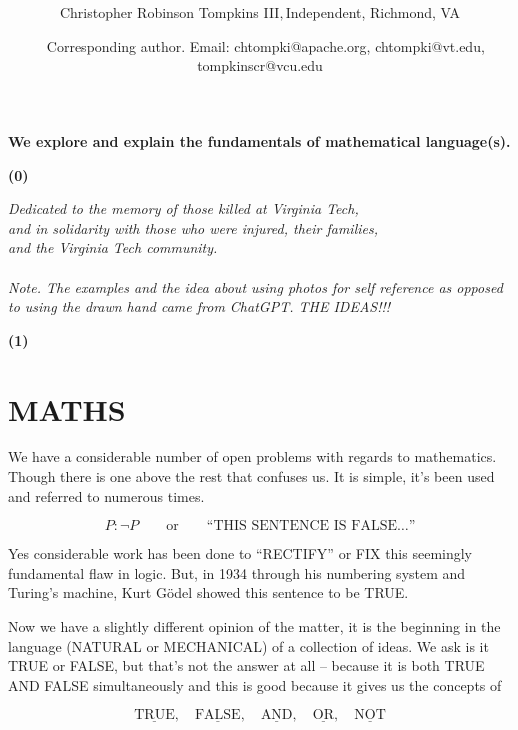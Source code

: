 \documentclass[12pt]{article}
\date{}
\title{\bfseries \boldmath \scititle}
\author{
	Christopher Robinson Tompkins III$,
	$Independent, Richmond, VA\and\
	Corresponding author. Email: chtompki@apache.org, chtompki@vt.edu, tompkinscr@vcu.edu
}
\renewenvironment{abstract}
	{\quotation}
	{\endquotation}
\begin{document}
 

\maketitle

\begin{abstract} \bfseries \boldmath
We explore and explain the fundamentals of mathematical language(s).
\end{abstract}


\textbf{(0)}
\begin{center}
    \emph{Dedicated to the memory of those killed at Virginia Tech,\\
    and in solidarity with those who were injured, their families,\\
    and the Virginia Tech community.}
    \qquad\\
    \qquad\\
    \emph{Note. The examples and the idea about using photos for self reference as opposed to using the drawn
    hand came from ChatGPT. THE IDEAS!!!}
\end{center}

\textbf{(1)}
\section*{MATHS}

We have a considerable number of open problems with regards to mathematics.
Though there is one above the rest that confuses us. It is simple, it's been
used and referred to numerous times.

\[
    P:\neg P
    \qquad\text{or}\qquad
    \text{``THIS SENTENCE IS FALSE\ldots''}
\]

Yes considerable work has been done to ``RECTIFY'' or FIX this seemingly
fundamental flaw in logic. But, in 1934 through his numbering system and
Turing's machine, Kurt G\"odel showed this sentence to be TRUE.

Now we have a slightly different opinion of the matter, it is the beginning in
the language (NATURAL or MECHANICAL) of a collection of ideas. We ask is it
TRUE or FALSE, but that's not the answer at all -- because it is both TRUE AND
FALSE simultaneously and this is good because it gives us the concepts of

\[
    \underline{\text{TRUE}},\quad
    \underline{\text{FALSE}},\quad
    \underline{\text{AND}},\quad
    \underline{\text{OR}},\quad
    \underline{\text{NOT}}
\]
\end{document}
